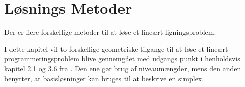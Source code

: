 \chapter{Løsnings Metoder}	
Der er flere forskellige metoder til at løse et lineært ligningsproblem. 

I dette kapitel vil to forskellige geometriske tilgange til at løse et lineært programmeringsproblem blive gennemgået med udgangs punkt i henholdsvis %
kapitel 2.1 og 3.6 fra \cite{bert}.
Den ene gør brug af niveaumængder, mens den anden benytter, at basisløsninger kan bruges til at beskrive en simplex.








